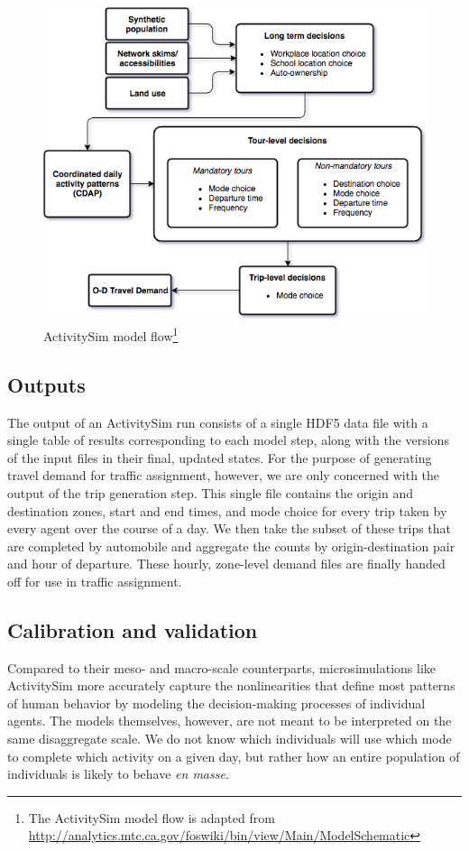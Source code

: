 \begin{figure}[htbp]
    \center
    \includegraphics[width=\textwidth]{graphics/asim_flow.png}
    \caption[ActivitySim model flow]{ActivitySim model flow\footnote{The ActivitySim model flow is adapted from \url{http://analytics.mtc.ca.gov/foswiki/bin/view/Main/ModelSchematic}}}
    \label{fig:asim-models}
\end{figure}

\subsection{Outputs}

The output of an ActivitySim run consists of a single HDF5 data file with a single table of results corresponding to each model step, along with the versions of the input files in their final, updated states. For the purpose of generating travel demand for traffic assignment, however, we are only concerned with the output of the trip generation step. This single file contains the origin and destination zones, start and end times, and mode choice for every trip taken by every agent over the course of a day. We then take the subset of these trips that are completed by automobile and aggregate the counts by origin-destination pair and hour of departure. These hourly, zone-level demand files are finally handed off for use in traffic assignment.

\subsection{Calibration and validation}
Compared to their meso- and macro-scale counterparts, microsimulations like ActivitySim more accurately capture the nonlinearities that define most patterns of human behavior by modeling the decision-making processes of individual agents. The models themselves, however, are not meant to be interpreted on the same disaggregate scale. We do not know which individuals will use which mode to complete which activity on a given day, but rather how an entire population of individuals is likely to behave \textit{en masse}.

